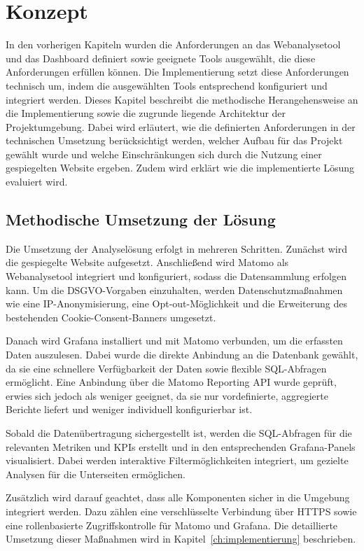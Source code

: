 \chapter{Konzept} %
\label{ch:konzept}
In den vorherigen Kapiteln wurden die Anforderungen an das Webanalysetool und das Dashboard definiert sowie geeignete Tools ausgewählt, die diese Anforderungen erfüllen können. Die Implementierung setzt diese Anforderungen technisch um, indem die ausgewählten Tools entsprechend konfiguriert und integriert werden. Dieses Kapitel beschreibt die methodische Herangehensweise an die Implementierung sowie die zugrunde liegende Architektur der Projektumgebung. Dabei wird erläutert, wie die definierten Anforderungen in der technischen Umsetzung berücksichtigt werden, welcher Aufbau für das Projekt gewählt wurde und welche Einschränkungen sich durch die Nutzung einer gespiegelten Website ergeben. Zudem wird erklärt wie die implementierte Lösung evaluiert wird.

\section{Methodische Umsetzung der Lösung}
\label{sec:umsetzungloesung}
Die Umsetzung der Analyselösung erfolgt in mehreren Schritten. Zunächst wird die gespiegelte Website aufgesetzt. Anschließend wird Matomo als Webanalysetool integriert und konfiguriert, sodass die Datensammlung erfolgen kann. Um die DSGVO-Vorgaben einzuhalten, werden Datenschutzmaßnahmen wie eine IP-Anonymisierung, eine Opt-out-Möglichkeit und die Erweiterung des bestehenden Cookie-Consent-Banners umgesetzt.

Danach wird Grafana installiert und mit Matomo verbunden, um die erfassten Daten auszulesen. Dabei wurde die direkte Anbindung an die Datenbank gewählt, da sie eine schnellere Verfügbarkeit der Daten sowie flexible SQL-Abfragen ermöglicht. Eine Anbindung über die Matomo Reporting API wurde geprüft, erwies sich jedoch als weniger geeignet, da sie nur vordefinierte, aggregierte Berichte liefert und weniger individuell konfigurierbar ist.

Sobald die Datenübertragung sichergestellt ist, werden die SQL-Abfragen für die relevanten Metriken und KPIs erstellt und in den entsprechenden Grafana-Panels visualisiert. Dabei werden interaktive Filtermöglichkeiten integriert, um gezielte Analysen für die Unterseiten ermöglichen.

Zusätzlich wird darauf geachtet, dass alle Komponenten sicher in die Umgebung integriert werden. Dazu zählen eine verschlüsselte Verbindung über HTTPS sowie eine rollenbasierte Zugriffskontrolle für Matomo und Grafana. Die detaillierte Umsetzung dieser Maßnahmen wird in Kapitel~\ref{ch:implementierung} beschrieben.

